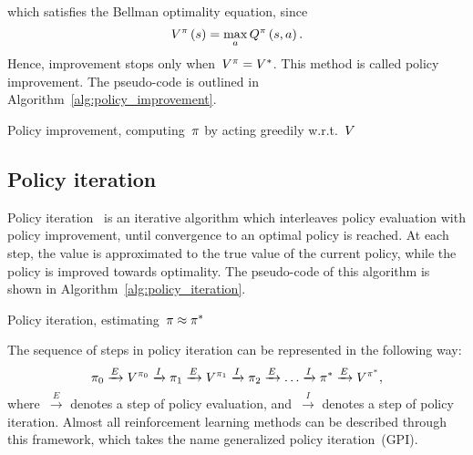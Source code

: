 which satisfies the Bellman optimality equation, since
\begin{equation}
	\statevalue\policyscript\left(\state\right)=\max_{\action}\actionvalue\policyscript\left(\state,\action\right).
\end{equation}
Hence, improvement stops only when~${V^{\pi}=V^{*}}$. This method is called policy improvement. The pseudo-code is outlined in Algorithm~\ref{alg:policy_improvement}.
\begin{algorithm}
	\caption{Policy improvement, computing~${\pi}$ by acting greedily w.r.t.~${\estimatestatevalue}$}
	\label{alg:policy_improvement}

\end{algorithm}

\subsection{Policy iteration}
Policy iteration~{\cite{howard1960dynamic}} is an iterative algorithm which interleaves policy evaluation with policy improvement, until convergence to an optimal policy is reached. At each step, the value is approximated to the true value of the current policy, while the policy is improved towards optimality. The pseudo-code of this algorithm is shown in Algorithm~\ref{alg:policy_iteration}.
\begin{algorithm}
	\caption{Policy iteration, estimating~${\pi\approx\pi^{*}}$}
	\label{alg:policy_iteration}

\end{algorithm}

The sequence of steps in policy iteration can be represented in the following way:
\begin{equation*}
	\pi_{0}\xrightarrow{E}V^{\pi_{0}}\xrightarrow{I}
	\pi_{1}\xrightarrow{E}V^{\pi_{1}}\xrightarrow{I}
	\pi_{2}\xrightarrow{E}\dots\xrightarrow{I}
	\pi^{*}\xrightarrow{E}V^{\pi^{*}},
\end{equation*}
where~${\xrightarrow{E}}$ denotes a step of policy evaluation, and~${\xrightarrow{I}}$ denotes a step of policy iteration. Almost all reinforcement learning methods can be described through this framework, which takes the name generalized policy iteration~(GPI).

